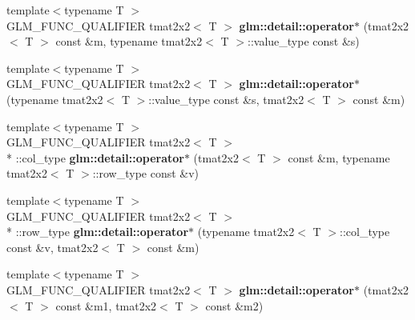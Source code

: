 \begin{DoxyCompactItemize}
\item 
\hypertarget{namespaceglm_1_1detail_a5f98eea98f44a7d0203cd29afc6e42e5}{{\footnotesize template$<$typename T $>$ }\\G\-L\-M\-\_\-\-F\-U\-N\-C\-\_\-\-Q\-U\-A\-L\-I\-F\-I\-E\-R tmat2x2$<$ T $>$ {\bfseries glm\-::detail\-::operator$\ast$} (tmat2x2$<$ T $>$ const \&m, typename tmat2x2$<$ T $>$\-::value\-\_\-type const \&s)}\label{namespaceglm_1_1detail_a5f98eea98f44a7d0203cd29afc6e42e5}

\item 
\hypertarget{namespaceglm_1_1detail_ac678332a184bf31b53cf2db22a908dd6}{{\footnotesize template$<$typename T $>$ }\\G\-L\-M\-\_\-\-F\-U\-N\-C\-\_\-\-Q\-U\-A\-L\-I\-F\-I\-E\-R tmat2x2$<$ T $>$ {\bfseries glm\-::detail\-::operator$\ast$} (typename tmat2x2$<$ T $>$\-::value\-\_\-type const \&s, tmat2x2$<$ T $>$ const \&m)}\label{namespaceglm_1_1detail_ac678332a184bf31b53cf2db22a908dd6}

\item 
\hypertarget{namespaceglm_1_1detail_a2ee193cd9fee0ec7617404509b09fc92}{{\footnotesize template$<$typename T $>$ }\\G\-L\-M\-\_\-\-F\-U\-N\-C\-\_\-\-Q\-U\-A\-L\-I\-F\-I\-E\-R tmat2x2$<$ T $>$\\*
\-::col\-\_\-type {\bfseries glm\-::detail\-::operator$\ast$} (tmat2x2$<$ T $>$ const \&m, typename tmat2x2$<$ T $>$\-::row\-\_\-type const \&v)}\label{namespaceglm_1_1detail_a2ee193cd9fee0ec7617404509b09fc92}

\item 
\hypertarget{namespaceglm_1_1detail_a35bcd115f72ddbbf54db829dbca452d9}{{\footnotesize template$<$typename T $>$ }\\G\-L\-M\-\_\-\-F\-U\-N\-C\-\_\-\-Q\-U\-A\-L\-I\-F\-I\-E\-R tmat2x2$<$ T $>$\\*
\-::row\-\_\-type {\bfseries glm\-::detail\-::operator$\ast$} (typename tmat2x2$<$ T $>$\-::col\-\_\-type const \&v, tmat2x2$<$ T $>$ const \&m)}\label{namespaceglm_1_1detail_a35bcd115f72ddbbf54db829dbca452d9}

\item 
\hypertarget{namespaceglm_1_1detail_a77408598000d67c2dbb3bf0eb17c828b}{{\footnotesize template$<$typename T $>$ }\\G\-L\-M\-\_\-\-F\-U\-N\-C\-\_\-\-Q\-U\-A\-L\-I\-F\-I\-E\-R tmat2x2$<$ T $>$ {\bfseries glm\-::detail\-::operator$\ast$} (tmat2x2$<$ T $>$ const \&m1, tmat2x2$<$ T $>$ const \&m2)}\label{namespaceglm_1_1detail_a77408598000d67c2dbb3bf0eb17c828b}


\end{DoxyCompactItemize}
